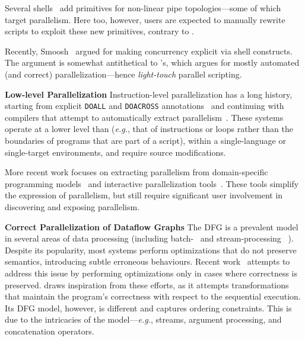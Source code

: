 \documentclass[letterpaper,twocolumn,10pt]{article}
\newcommand{\eg}{{\em e.g.}, }
\newcommand{\heading}[1]{\vspace{4pt}\noindent\textbf{#1}\enspace}
\newcommand{\ttt}[1]{\texttt{#1}}
\begin{document}
Several shells~\cite{duff1990rc, mcdonald1988support, dagsh:17} add primitives for non-linear pipe topologies---some of which target parallelism.
Here too, however, users are expected to manually rewrite scripts to exploit these new primitives, contrary to \sys.

Recently, Smoosh~\cite{smoosh:18} argued for making concurrency explicit via shell constructs.
The argument is somewhat antithetical to \sys's, which argues for mostly automated (and correct) parallelization---hence \emph{light-touch} parallel scripting.


\heading{Low-level Parallelization}
Instruction-level parallelization has a long history, starting from explicit \ttt{DOALL} and \ttt{DOACROSS} annotations~\cite{par1, par2} and continuing with compilers that attempt to automatically extract parallelism~\cite{padua1993polaris,hall1996maximizing}.
These systems operate at a lower level than \sys (\eg that of instructions or loops rather than the boundaries of programs that are part of a script), within a single-language or single-target environments, and require source modifications.

More recent work focuses on extracting parallelism from domain-specific programming models~\cite{cilk5, streamIt, galois} and interactive parallelization tools~\cite{parascope, ipat}.
These tools simplify the expression of parallelism, but still require significant user involvement in discovering and exposing parallelism.

\heading{Correct Parallelization of Dataflow Graphs}
The DFG is a prevalent model in several areas of data processing (including batch-~\cite{mapreduce:08, spark:12} and stream-processing ~\cite{murray2013naiad, carbone2015flink}).
Despite its popularity, most systems perform optimizations that do not preserve semantics, introducing subtle erroneous behaviours.
Recent work~\cite{HSSGG2014, SHGW2015, MSAIT2019} attempts to address this issue by performing optimizations only in cases where correctness is preserved.
\sys draws inspiration from these efforts, as it attempts transformations that maintain the program's correctness with respect to the sequential execution.
Its  DFG model, however, is different and captures ordering constraints.
This is due to the intricacies of the \unix model---\eg streams, argument processing, and concatenation operators.
\end{document}
